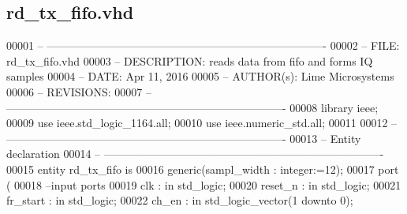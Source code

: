 \subsection{rd\+\_\+tx\+\_\+fifo.\+vhd}
\label{rd__tx__fifo_8vhd_source}

\begin{DoxyCode}
00001 \textcolor{keyword}{-- ---------------------------------------------------------------------------- }
00002 \textcolor{keyword}{-- FILE:    rd\_tx\_fifo.vhd}
00003 \textcolor{keyword}{-- DESCRIPTION: reads data from fifo and forms IQ samples}
00004 \textcolor{keyword}{-- DATE:    Apr 11, 2016}
00005 \textcolor{keyword}{-- AUTHOR(s):   Lime Microsystems}
00006 \textcolor{keyword}{-- REVISIONS:}
00007 \textcolor{keyword}{-- ---------------------------------------------------------------------------- }
00008 \textcolor{vhdlkeyword}{library }\textcolor{keywordflow}{ieee};
00009 \textcolor{vhdlkeyword}{use }ieee.std\_logic\_1164.\textcolor{keywordflow}{all};
00010 \textcolor{vhdlkeyword}{use }ieee.numeric\_std.\textcolor{keywordflow}{all};
00011 
00012 \textcolor{keyword}{-- ----------------------------------------------------------------------------}
00013 \textcolor{keyword}{-- Entity declaration}
00014 \textcolor{keyword}{-- ----------------------------------------------------------------------------}
00015 \textcolor{keywordflow}{entity }rd_tx_fifo \textcolor{keywordflow}{is}
00016   \textcolor{keywordflow}{generic}\textcolor{vhdlchar}{(}\textcolor{vhdlchar}{sampl_width} \textcolor{vhdlchar}{:} \textcolor{comment}{integer}\textcolor{vhdlchar}{:=}\textcolor{vhdllogic}{}\textcolor{vhdllogic}{12}\textcolor{vhdlchar}{)};
00017   \textcolor{keywordflow}{port} \textcolor{vhdlchar}{(}
00018 \textcolor{keyword}{        --input ports }
00019       \textcolor{vhdlchar}{clk}           \textcolor{vhdlchar}{:} \textcolor{keywordflow}{in} \textcolor{comment}{std\_logic};
00020       \textcolor{vhdlchar}{reset_n}       \textcolor{vhdlchar}{:} \textcolor{keywordflow}{in} \textcolor{comment}{std\_logic};
00021       \textcolor{vhdlchar}{fr_start}  \textcolor{vhdlchar}{:} \textcolor{keywordflow}{in} \textcolor{comment}{std\_logic};
00022       \textcolor{vhdlchar}{ch_en}         \textcolor{vhdlchar}{:} \textcolor{keywordflow}{in} \textcolor{comment}{std\_logic\_vector}\textcolor{vhdlchar}{(}\textcolor{vhdllogic}{}\textcolor{vhdllogic}{1} \textcolor{keywordflow}{downto} \textcolor{vhdllogic}{}\textcolor{vhdllogic}{0}\textcolor{vhdlchar}{)};

\end{DoxyCode}
